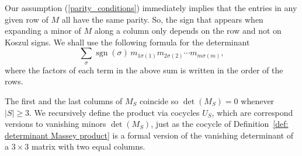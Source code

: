 \documentclass[11pt]{article}
\theoremstyle{definition}
\theoremstyle{definition}
\begin{document}
Our assumption (\ref{parity_conditions}) immediately implies that the entries in any given row of $M$ all have the same parity.
So, the sign that appears when expanding a minor of $M$ along a column only depends on the row and not on Koszul signs.
We shall use the following formula for the determinant
\begin{equation*}
\sum_{\sigma}\operatorname{sgn}( \sigma)\,m_{ 1\sigma(1)} m_{2\sigma(2)} \cdots m_{m\sigma(m)},
\end{equation*}
where the factors of each term in the above sum is written in the order of the rows. 


The first and the last columns of $M_S$ coincide so $\det(M_S)=0$ whenever $|S|\geq 3$.
We recursively define the product via cocycles $U_S$, which are correspond versions to vanishing minors $\det(M_S)$,
just as the cocycle of Definition~\ref{def: determinant Massey product} is a formal version of the vanishing determinant
of a $3\times 3$ matrix with two equal columns.
\end{document}
